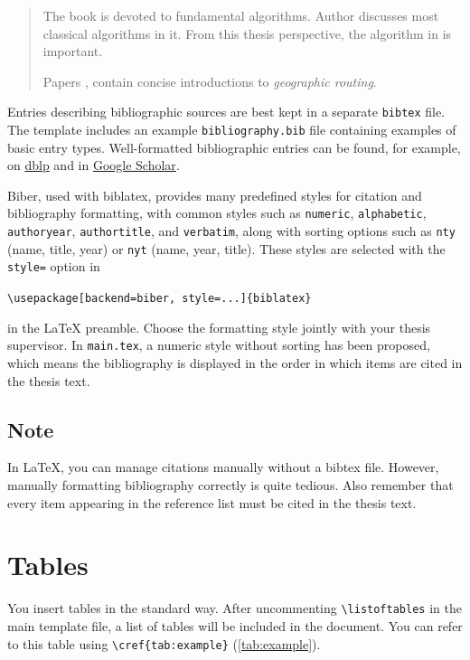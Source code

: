 \begin{quote}
   The book \cite{KNUTH01} is devoted to fundamental algorithms.
   Author \citeauthor{KNUTH01} discusses most classical algorithms in it.
   From this thesis perspective, the algorithm in \textcite[249]{KNUTH02} is important.\par
   Papers \cite{KuhnWZ08}, \cite{PapaGeo07} contain concise introductions to \textit{geographic routing}.
\end{quote}

Entries describing bibliographic sources are best kept in a separate \texttt{bibtex} file.
The template includes an example \texttt{bibliography.bib} file containing examples of basic entry types.
Well-formatted bibliographic entries can be found, for example, on
\href{https://dblp.org/}{dblp} and in \href{https://scholar.google.com/}{Google Scholar}. \par


Biber, used with biblatex, provides many predefined styles for citation and bibliography formatting, with common styles such as
\texttt{numeric}, \texttt{alphabetic}, \texttt{authoryear}, \texttt{authortitle}, and \texttt{verbatim},
along with sorting options such as \texttt{nty} (name, title, year) or \texttt{nyt} (name, year, title).
These styles are selected with the \texttt{style=} option in
\begin{center}
\verb|\usepackage[backend=biber, style=...]{biblatex}|
\end{center}
in the LaTeX preamble. Choose the formatting style jointly with your thesis supervisor. In \texttt{main.tex}, a numeric style without sorting has been proposed, which means the bibliography is displayed in the order in which items are cited in the thesis text.

\subsection*{Note} In LaTeX, you can manage citations manually without a bibtex file. However, manually formatting bibliography correctly is quite tedious. Also remember that every item appearing in the reference list must be cited in the thesis text.

\section{Tables}

You insert tables in the standard way.
After uncommenting \verb|\listoftables| in the main template file, a list of tables will be included in the document.
You can refer to this table using \verb|\cref{tab:example}| (\cref{tab:example}).

